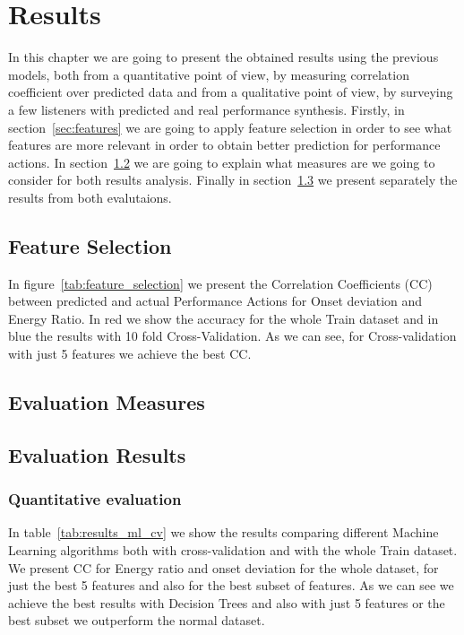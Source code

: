 \chapter{Results}
\label{chap:results}
In this chapter we are going to present the obtained results using the previous models, both from a quantitative point of view, by measuring correlation coefficient over predicted data and from a qualitative point of view, by surveying a few listeners with predicted and real performance synthesis. Firstly, in section~\ref{sec:features} we are going to apply feature selection in order to see what features are more relevant in order to obtain better prediction for performance actions. In section~\ref{sec:ev_measures} we are going to explain what measures are we going to consider for both results analysis. Finally in section~\ref{sec:ev_results} we present separately the results from both evalutaions.

\section{Feature Selection}
In figure~\ref{tab:feature_selection} we present the Correlation Coefficients (CC) between predicted and actual Performance Actions for Onset deviation and Energy Ratio. In red we show the accuracy for the whole Train dataset and in blue the results with 10 fold Cross-Validation. As we can see, for Cross-validation with just 5 features we achieve the best CC.






\label{sec:features}

\section{Evaluation Measures}
\label{sec:ev_measures}

\section{Evaluation Results}
\label{sec:ev_results}

\subsection{Quantitative evaluation}
In table~\ref{tab:results_ml_cv} we show the results comparing different Machine Learning algorithms both with cross-validation and with the whole Train dataset. We present CC for Energy ratio and onset deviation for the whole dataset, for just the best 5 features and also for the best subset of features. As we can see we achieve the best results with Decision Trees and also with just 5 features or the best subset we outperform the normal dataset.

